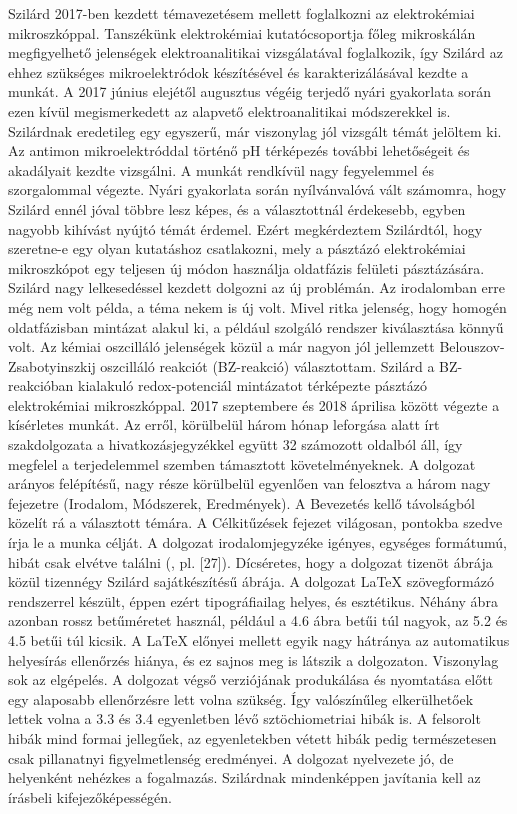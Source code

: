 \documentclass[11pt, a4paper]{letter} %
\begin{document}
\begin{letter}{
}
Szilárd 2017-ben kezdett témavezetésem mellett foglalkozni az elektrokémiai mikroszkóppal. Tanszékünk elektrokémiai kutatócsoportja főleg mikroskálán megfigyelhető jelenségek elektroanalitikai vizsgálatával foglalkozik, így Szilárd az ehhez szükséges mikroelektródok készítésével és karakterizálásával kezdte a munkát. A 2017 június elejétől augusztus végéig terjedő nyári gyakorlata során ezen kívül megismerkedett az alapvető elektroanalitikai módszerekkel is. Szilárdnak eredetileg egy egyszerű, már viszonylag jól vizsgált témát jelöltem ki. Az antimon mikroelektróddal történő pH térképezés további lehetőségeit és akadályait kezdte vizsgálni. A munkát rendkívül nagy fegyelemmel és szorgalommal végezte. Nyári gyakorlata során nyílvánvalóvá vált számomra, hogy Szilárd ennél jóval többre lesz képes, és a választottnál érdekesebb, egyben nagyobb kihívást nyújtó témát érdemel. Ezért megkérdeztem Szilárdtól, hogy szeretne-e egy olyan kutatáshoz csatlakozni, mely a pásztázó elektrokémiai mikroszkópot egy teljesen új módon használja oldatfázis felületi pásztázására. Szilárd nagy lelkesedéssel kezdett dolgozni az új problémán. Az irodalomban erre még nem volt példa, a téma nekem is új volt. Mivel ritka jelenség, hogy homogén oldatfázisban mintázat alakul ki, a például szolgáló rendszer kiválasztása könnyű volt. Az kémiai oszcilláló jelenségek közül a már nagyon jól jellemzett Belouszov-Zsabotyinszkij oszcilláló reakciót (BZ-reakció) választottam. Szilárd a BZ-reakcióban kialakuló redox-potenciál mintázatot térképezte pásztázó elektrokémiai mikroszkóppal. 2017 szeptembere és 2018 áprilisa között végezte a kísérletes munkát. Az erről, körülbelül három hónap leforgása alatt írt szakdolgozata a hivatkozásjegyzékkel együtt 32 számozott oldalból áll, így megfelel a terjedelemmel szemben támasztott követelményeknek. A dolgozat arányos felépítésű, nagy része körülbelül egyenlően van felosztva a három nagy fejezetre (Irodalom, Módszerek, Eredmények). A Bevezetés kellő távolságból közelít rá a választott témára. A Célkitűzések fejezet világosan, pontokba szedve írja le a munka célját. A dolgozat irodalomjegyzéke igényes, egységes formátumú, hibát csak elvétve találni (, pl. [27]). Dícséretes, hogy a dolgozat tizenöt ábrája közül tizennégy Szilárd sajátkészítésű ábrája. A dolgozat LaTeX szövegformázó rendszerrel készült, éppen ezért tipográfiailag helyes, és esztétikus. Néhány ábra azonban rossz betűméretet használ, például a 4.6 ábra betűi túl nagyok, az 5.2 és 4.5 betűi túl kicsik. A LaTeX előnyei mellett egyik nagy hátránya az automatikus helyesírás ellenőrzés hiánya, és ez sajnos meg is látszik a dolgozaton. Viszonylag sok az elgépelés. A dolgozat végső verziójának produkálása és nyomtatása előtt egy alaposabb ellenőrzésre lett volna szükség. Így valószínűleg elkerülhetőek lettek volna a 3.3 és 3.4 egyenletben lévő sztöchiometriai hibák is. A felsorolt hibák mind formai jellegűek, az egyenletekben vétett hibák pedig természetesen csak pillanatnyi figyelmetlenség eredményei. A dolgozat nyelvezete jó, de helyenként nehézkes a fogalmazás. Szilárdnak mindenképpen javítania kell az írásbeli kifejezőképességén.


\end{letter}
\end{document}

